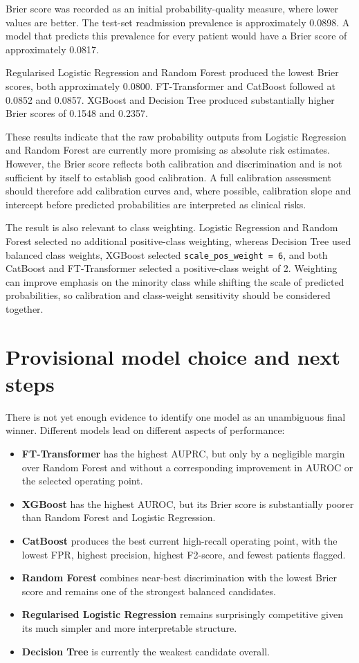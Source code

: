 \documentclass[11pt,a4paper]{article}
\begin{document}
Brier score was recorded as an initial probability-quality measure, where lower values are better. The test-set readmission prevalence is approximately 0.0898. A model that predicts this prevalence for every patient would have a Brier score of approximately 0.0817.

Regularised Logistic Regression and Random Forest produced the lowest Brier scores, both approximately 0.0800. FT-Transformer and CatBoost followed at 0.0852 and 0.0857. XGBoost and Decision Tree produced substantially higher Brier scores of 0.1548 and 0.2357.

These results indicate that the raw probability outputs from Logistic Regression and Random Forest are currently more promising as absolute risk estimates. However, the Brier score reflects both calibration and discrimination and is not sufficient by itself to establish good calibration. A full calibration assessment should therefore add calibration curves and, where possible, calibration slope and intercept before predicted probabilities are interpreted as clinical risks.

The result is also relevant to class weighting. Logistic Regression and Random Forest selected no additional positive-class weighting, whereas Decision Tree used balanced class weights, XGBoost selected \texttt{scale\_pos\_weight = 6}, and both CatBoost and FT-Transformer selected a positive-class weight of 2. Weighting can improve emphasis on the minority class while shifting the scale of predicted probabilities, so calibration and class-weight sensitivity should be considered together.

\section{Provisional model choice and next steps}

There is not yet enough evidence to identify one model as an unambiguous final winner. Different models lead on different aspects of performance:

\begin{itemize}
    \item \textbf{FT-Transformer} has the highest AUPRC, but only by a negligible margin over Random Forest and without a corresponding improvement in AUROC or the selected operating point.
    \item \textbf{XGBoost} has the highest AUROC, but its Brier score is substantially poorer than Random Forest and Logistic Regression.
    \item \textbf{CatBoost} produces the best current high-recall operating point, with the lowest FPR, highest precision, highest F2-score, and fewest patients flagged.
    \item \textbf{Random Forest} combines near-best discrimination with the lowest Brier score and remains one of the strongest balanced candidates.
    \item \textbf{Regularised Logistic Regression} remains surprisingly competitive given its much simpler and more interpretable structure.
    \item \textbf{Decision Tree} is currently the weakest candidate overall.
\end{itemize}
\end{document}
